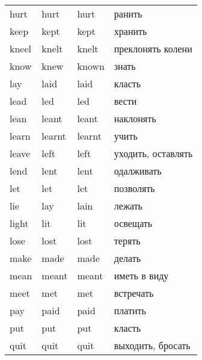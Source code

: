 \begin{longtable}{| m{} | m{} | m{} | m{} |}
    hurt               & hurt                & hurt                    & ранить              \\
    keep               & kept                & kept                    & хранить             \\
    kneel              & knelt               & knelt                   & преклонять колени   \\
    know               & knew                & known                   & знать               \\
    lay                & laid                & laid                    & класть              \\
    lead               & led                 & led                     & вести               \\
    lean               & leant               & leant                   & наклонять           \\
    learn              & learnt              & learnt                  & учить               \\
    leave              & left                & left                    & уходить, оставлять  \\
    lend               & lent                & lent                    & одалживать          \\
    let                & let                 & let                     & позволять           \\
    lie                & lay                 & lain                    & лежать              \\
    light              & lit                 & lit                     & освещать            \\
    lose               & lost                & lost                    & терять              \\
    make               & made                & made                    & делать              \\
    mean               & meant               & meant                   & иметь в виду        \\
    meet               & met                 & met                     & встречать           \\
    pay                & paid                & paid                    & платить             \\
    put                & put                 & put                     & класть              \\
    quit               & quit                & quit                    & выходить, бросать   \\

\end{longtable}
